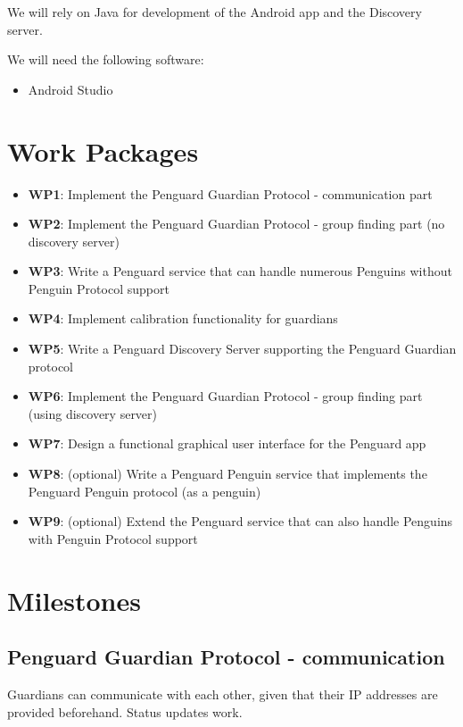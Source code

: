 \documentclass{report}
\begin{document}
We will rely on Java for development of the Android app and the Discovery server.

We will need the following software:

\begin{itemize}
    \item Android Studio
\end{itemize}


\section{Work Packages}

\begin{itemize}
        \item {\bf WP1}: Implement the Penguard Guardian Protocol - communication part
        \item {\bf WP2}: Implement the Penguard Guardian Protocol - group finding part (no discovery server)
        \item {\bf WP3}: Write a Penguard service that can handle numerous Penguins without Penguin Protocol support
        \item {\bf WP4}: Implement calibration functionality for guardians
        \item {\bf WP5}: Write a Penguard Discovery Server supporting the Penguard Guardian protocol
        \item {\bf WP6}: Implement the Penguard Guardian Protocol - group finding part (using discovery server)
        \item {\bf WP7}: Design a functional graphical user interface for the Penguard app
        \item {\bf WP8}: (optional) Write a Penguard Penguin service that implements the Penguard Penguin protocol (as a penguin)
        \item {\bf WP9}: (optional) Extend the Penguard service that can also handle Penguins with Penguin Protocol support
\end{itemize}
 

\section{Milestones}

\subsection{Penguard Guardian Protocol - communication}

Guardians can communicate with each other, given that their IP addresses are provided beforehand. Status updates work.
\end{document}
